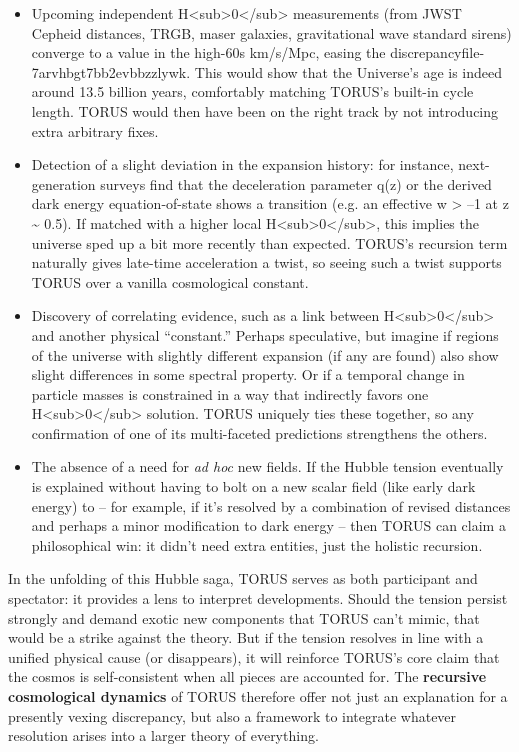 \documentclass[
]{article}
\begin{document}
\begin{itemize}
\item
  Upcoming independent
  H\textless sub\textgreater0\textless/sub\textgreater{} measurements
  (from JWST Cepheid distances, TRGB, maser galaxies, gravitational wave
  standard sirens) converge to a value in the high-60s km/s/Mpc, easing
  the discrepancy\hspace{0pt}file-7arvhbgt7bb2evbbzzlywk. This would
  show that the Universe's age is indeed around 13.5 billion years,
  comfortably matching TORUS's built-in cycle length. TORUS would then
  have been on the right track by not introducing extra arbitrary fixes.
\item
  Detection of a slight deviation in the expansion history: for
  instance, next-generation surveys find that the deceleration parameter
  q(z) or the derived dark energy equation-of-state shows a transition
  (e.g. an effective w \textgreater{} --1 at z \textasciitilde{} 0.5).
  If matched with a higher local
  H\textless sub\textgreater0\textless/sub\textgreater, this implies the
  universe sped up a bit more recently than expected. TORUS's recursion
  term naturally gives late-time acceleration a twist, so seeing such a
  twist supports TORUS over a vanilla cosmological constant.
\item
  Discovery of correlating evidence, such as a link between
  H\textless sub\textgreater0\textless/sub\textgreater{} and another
  physical ``constant.'' Perhaps speculative, but imagine if regions of
  the universe with slightly different expansion (if any are found) also
  show slight differences in some spectral property. Or if a temporal
  change in particle masses is constrained in a way that indirectly
  favors one H\textless sub\textgreater0\textless/sub\textgreater{}
  solution. TORUS uniquely ties these together, so any confirmation of
  one of its multi-faceted predictions strengthens the others.
\item
  The absence of a need for \emph{ad hoc} new fields. If the Hubble
  tension eventually is explained without having to bolt on a new scalar
  field (like early dark energy) to \LambdaCDM -- for example, if it's
  resolved by a combination of revised distances and perhaps a minor
  modification to dark energy -- then TORUS can claim a philosophical
  win: it didn't need extra entities, just the holistic recursion.
\end{itemize}

In the unfolding of this Hubble saga, TORUS serves as both participant
and spectator: it provides a lens to interpret developments. Should the
tension persist strongly and demand exotic new components that TORUS
can't mimic, that would be a strike against the theory. But if the
tension resolves in line with a unified physical cause (or disappears),
it will reinforce TORUS's core claim that the cosmos is self-consistent
when all pieces are accounted for. The \textbf{recursive cosmological
dynamics} of TORUS therefore offer not just an explanation for a
presently vexing discrepancy, but also a framework to integrate whatever
resolution arises into a larger theory of everything.
\end{document}
